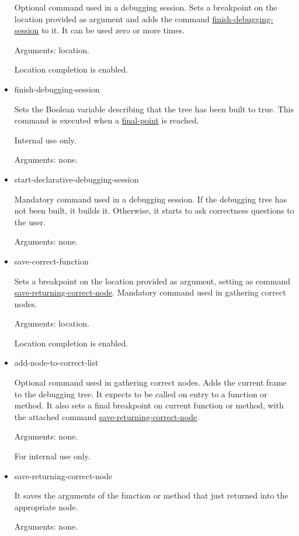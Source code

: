 \begin{itemize}
Optional command used in a debugging session.
Sets a breakpoint on the location provided as argument and adds the command \hyperref[command:finish-debugging-session]{finish-debugging-session} to it.
It can be used zero or more times.

Arguments: location.

Location completion is enabled.
\item finish-debugging-session
\label{command:finish-debugging-session}

Sets the Boolean variable describing that the tree has been built to true.
This command is executed when a \hyperref[command:final-point]{final-point} is reached.

Internal use only.

Arguments: none.
\item start-declarative-debugging-session
\label{command:start-declarative-debugging-session}

Mandatory command used in a debugging session.
If the debugging tree has not been built, it builds it. Otherwise, it starts to ask correctness questions to the user.

Arguments: none.
\item save-correct-function
\label{command:save-correct-function}

Sets a breakpoint on the location provided as argument, setting as command \hyperref[command:save-returning-correct-node]{save-returning-correct-node}. Mandatory command used in gathering correct nodes.

Arguments: location.

Location completion is enabled.
\item add-node-to-correct-list
\label{command:add-node-to-correct-list}

Optional command used in gathering correct nodes.
Adds the current frame to the debugging tree.
It expects to be called on entry to a function or method.
It also sets a final breakpoint on current function or method, with the attached command \hyperref[command:save-returning-correct-node]{save-returning-correct-node}.

Arguments: none.

For internal use only.
\item save-returning-correct-node
\label{command:save-returning-correct-node}

It saves the arguments of the function or method that just returned into the appropriate node.

Arguments: none.


\end{itemize}
